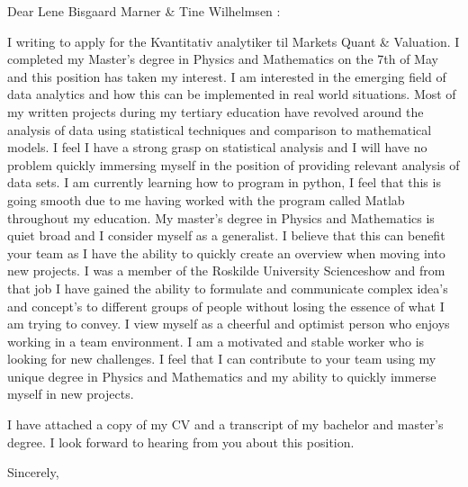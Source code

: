 \documentclass[10pt,a4paper]{letter}
\begin{document}
\begin{letter}{}
\opening{Dear Lene Bisgaard Marner \& Tine Wilhelmsen :}

I writing to apply for the Kvantitativ analytiker til Markets Quant \& Valuation. I completed my Master's degree in Physics and Mathematics on the 7th of May and this position has taken my interest. I am interested in the emerging field of data analytics and how this can be implemented in real world situations. Most of my written projects during my tertiary education have revolved around the analysis of data using statistical techniques and comparison to mathematical models. I feel I have a strong grasp on statistical analysis and I will have no problem quickly immersing myself in the position of providing relevant analysis of data sets. I am currently learning how to program in python, I feel that this is going smooth due to me having worked with the program called Matlab throughout my education. My master's degree in Physics and Mathematics is quiet broad and I consider myself as a generalist. I believe that this can benefit your team as I have the ability to quickly create an overview when moving into new projects. I was a member of the Roskilde University Scienceshow and from that job I have gained the ability to formulate and communicate complex idea's and concept's to different groups of people without losing the essence of what I am trying to convey.  I view myself as a cheerful and optimist person who enjoys working in a team environment. I am a motivated and stable worker who is looking for new challenges. I feel that I can contribute to your team using my unique degree in Physics and Mathematics and my ability to quickly immerse myself in new projects. 

I have attached a copy of my CV and a transcript of my bachelor and master's degree. I look forward to hearing from you about this position.   

\closing{Sincerely,}

\end{letter}

\end{document}
